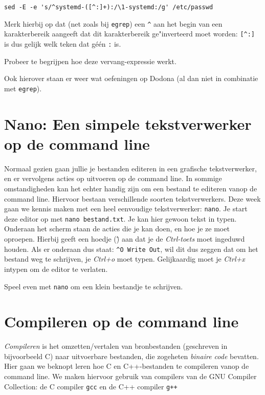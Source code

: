\documentclass[a4paper,twoside,openany]{memoir}
\begin{document}
\begin{verbatim}
sed -E -e 's/^systemd-([^:]+):/\1-systemd:/g' /etc/passwd
\end{verbatim}

Merk hierbij op dat (net zoals bij \verb!egrep!) een \verb!^! aan het begin van
een karakterbereik aangeeft dat dit karakterbereik ge"inverteerd moet worden:
\verb![^:]! is dus gelijk welk teken dat géén \verb!:! is.

Probeer te begrijpen hoe deze vervang-expressie werkt.

Ook hierover staan er weer wat oefeningen op Dodona (al dan niet in combinatie
met \verb!egrep!).

\chapter{Nano: Een simpele tekstverwerker op de command line}

Normaal gezien gaan jullie je bestanden editeren in een grafische
tekstverwerker, en er vervolgens acties op uitvoeren op de command line. In
sommige omstandigheden kan het echter handig zijn om een bestand te editeren
vanop de command line. Hiervoor bestaan verschillende soorten tekstverwerkers.
Deze week gaan we kennis maken met een heel eenvoudige tekstverwerker:
\verb!nano!. Je start deze editor op met \verb!nano bestand.txt!. Je kan hier
gewoon tekst in typen. Onderaan het scherm staan de acties die je kan doen, en
hoe je ze moet oproepen. Hierbij geeft een hoedje (\^) aan dat je de
\emph{Ctrl-toets} moet ingeduwd houden. Als er onderaan dus staat: \verb!^O Write Out!,
wil dit dus zeggen dat om het bestand weg te schrijven, je \emph{Ctrl+o} moet
typen. Gelijkaardig moet je \emph{Ctrl+x} intypen om de editor te verlaten.

Speel even met \verb!nano! om een klein bestandje te schrijven.


\chapter{Compileren op de command line}

\emph{Compileren} is het omzetten/vertalen van bronbestanden (geschreven in
bijvoorbeeld C) naar uitvoerbare bestanden, die zogeheten \emph{binaire code}
bevatten. Hier gaan we beknopt leren hoe C en C++-bestanden te compileren vanop
de command line. We maken hiervoor gebruik van compilers van de GNU Compiler
Collection: de C compiler \verb!gcc! en de C++ compiler \verb!g++! 
\end{document}
